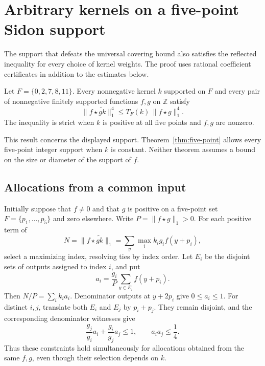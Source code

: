 \section{Arbitrary kernels on a five-point Sidon support}
\label{sec:five-point-weighted}

The support that defeats the universal covering bound also satisfies the
reflected inequality for every choice of kernel weights. The proof uses
rational coefficient certificates in addition to the estimates below.

\begin{theorem}\label{thm:five-point-weighted}
Let $F=\{0,2,7,8,11\}$. Every nonnegative kernel $k$ supported on $F$
and every pair of nonnegative finitely supported functions $f,g$ on
$\mathbb Z$ satisfy
\[
 \|f\star\widetilde{gk}\|_1^4
 \le T_F(k)\,\|f\star g\|_1^4.
\]
The inequality is strict when $k$ is positive at all five points and
$f,g$ are nonzero.
\end{theorem}

This result concerns the displayed support. Theorem~\ref{thm:five-point}
allows every five-point integer support when $k$ is constant. Neither
theorem assumes a bound on the size or diameter of the support of $f$.

\subsection{Allocations from a common input}

Initially suppose that $f\ne0$ and that $g$ is positive on a five-point
set $F=\{p_1,\ldots,p_5\}$ and zero elsewhere. Write
$P=\|f\star g\|_1>0$. For each positive term of
\[
 N=\|f\star\widetilde{gk}\|_1
   =\sum_y\max_i k_i g_i f(y+p_i),
\]
select a maximizing index, resolving ties by index order. Let $E_i$
be the disjoint sets of outputs assigned to index $i$, and put
\[
 a_i=\frac{g_i}{P}\sum_{y\in E_i}f(y+p_i).
\]
Then $N/P=\sum_i k_i a_i$. Denominator outputs at $y+2p_i$ give
$0\le a_i\le1$. For distinct $i,j$, translate both $E_i$ and $E_j$
by $p_i+p_j$. They remain disjoint, and the corresponding denominator
witnesses give
\begin{equation}\label{weighted-pairs}
 \frac{g_j}{g_i}a_i+\frac{g_i}{g_j}a_j\le1,
 \qquad a_i a_j\le\frac14.
\end{equation}
Thus these constraints hold simultaneously for allocations obtained
from the same $f,g$, even though their selection depends on $k$.

